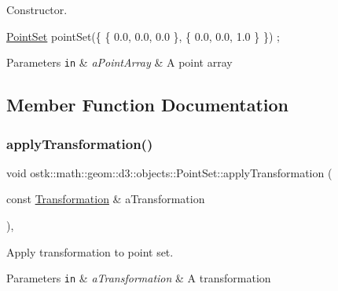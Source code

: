 Constructor. 


\begin{DoxyCode}
\hyperlink{classostk_1_1math_1_1geom_1_1d3_1_1objects_1_1_point_set_a285835d8348a60ceaf227bd76e3a5546}{PointSet} pointSet(\{ \{ 0.0, 0.0, 0.0 \}, \{ 0.0, 0.0, 1.0 \} \}) ;
\end{DoxyCode}



\begin{DoxyParams}[1]{Parameters}
\mbox{\tt in}  & {\em a\+Point\+Array} & A point array \\
\hline
\end{DoxyParams}


\subsection{Member Function Documentation}
\mbox{\label{classostk_1_1math_1_1geom_1_1d3_1_1objects_1_1_point_set_af03e071aa9d7a364a0c76f563b65a57e}} 
\subsubsection{\texorpdfstring{apply\+Transformation()}{applyTransformation()}}
{\footnotesize\ttfamily void ostk\+::math\+::geom\+::d3\+::objects\+::\+Point\+Set\+::apply\+Transformation (\begin{DoxyParamCaption}\item[{const \hyperlink{classostk_1_1math_1_1geom_1_1d3_1_1_transformation}{Transformation} \&}]{a\+Transformation }\end{DoxyParamCaption})\hspace{0.3cm}{\ttfamily [override]}, {\ttfamily [virtual]}}



Apply transformation to point set. 


\begin{DoxyParams}[1]{Parameters}
\mbox{\tt in}  & {\em a\+Transformation} & A transformation \\
\hline
\end{DoxyParams}


